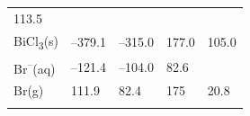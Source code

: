 \documentclass[
  9pt,
]{extbook}
\theoremstyle{definition}
\theoremstyle{definition}
\theoremstyle{definition}
\theoremstyle{remark}
\begin{document}
\begin{longtable}[]{@{}lllll@{}}
\begin{minipage}[t]{0.18\columnwidth}
113.5\strut
\end{minipage}\tabularnewline
\begin{minipage}[t]{0.10\columnwidth}\raggedright
BiCl\textsubscript{3}(s)\strut
\end{minipage} & \begin{minipage}[t]{0.19\columnwidth}\raggedright
--379.1\strut
\end{minipage} & \begin{minipage}[t]{0.20\columnwidth}\raggedright
--315.0\strut
\end{minipage} & \begin{minipage}[t]{0.18\columnwidth}\raggedright
177.0\strut
\end{minipage} & \begin{minipage}[t]{0.18\columnwidth}\raggedright
105.0\strut
\end{minipage}\tabularnewline
\begin{minipage}[t]{0.10\columnwidth}\raggedright
Br\textsuperscript{--}(aq)\strut
\end{minipage} & \begin{minipage}[t]{0.19\columnwidth}\raggedright
--121.4\strut
\end{minipage} & \begin{minipage}[t]{0.20\columnwidth}\raggedright
--104.0\strut
\end{minipage} & \begin{minipage}[t]{0.18\columnwidth}\raggedright
82.6\strut
\end{minipage} & \begin{minipage}[t]{0.18\columnwidth}\raggedright
\strut
\end{minipage}\tabularnewline
\begin{minipage}[t]{0.10\columnwidth}\raggedright
Br(g)\strut
\end{minipage} & \begin{minipage}[t]{0.19\columnwidth}\raggedright
111.9\strut
\end{minipage} & \begin{minipage}[t]{0.20\columnwidth}\raggedright
82.4\strut
\end{minipage} & \begin{minipage}[t]{0.18\columnwidth}\raggedright
175\strut
\end{minipage} & \begin{minipage}[t]{0.18\columnwidth}\raggedright
20.8\strut
\end{minipage}\tabularnewline
\begin{minipage}[t]{0.10\columnwidth}\raggedright

\end{minipage}
\end{longtable}
\end{document}
